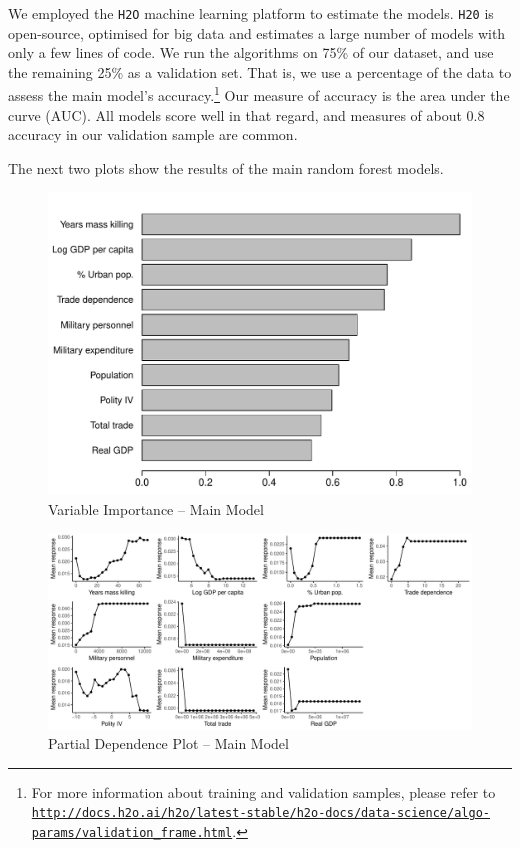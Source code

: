 We employed the \texttt{H2O} machine learning platform \citep{h2o2017} to estimate the models. \texttt{H20} is open-source, optimised for big data and estimates a large number of models with only a few lines of code. We run the algorithms on 75\% of our dataset, and use the remaining 25\% as a validation set. That is, we use a percentage of the data to assess the main model's accuracy.\footnote{For more information about training and validation samples, please refer to \href{http://docs.h2o.ai/h2o/latest-stable/h2o-docs/data-science/algo-params/validation_frame.html}{\texttt{http://docs.h2o.ai/h2o/latest-stable/h2o-docs/data-science/algo-params/validation\_frame.html}}.} Our measure of accuracy is the area under the curve (AUC). All models score well in that regard, and measures of about 0.8 accuracy in our validation sample are common.

The next two plots show the results of the main random forest models. 

\begin{figure}[H]
    \centering
    \includegraphics[width=.85\textwidth]{images/rf-mk.pdf}
    \caption{Variable Importance -- Main Model}
    \label{fig:rf-mk}
\end{figure}

\newpage 

\clearpage
\begin{figure}
    \centering
    \includegraphics[width=.85\textwidth]{images/rf-mk-pd.pdf}
    \caption{Partial Dependence Plot -- Main Model}
    \label{fig:rf-mk-pd}
\end{figure}
\clearpage

